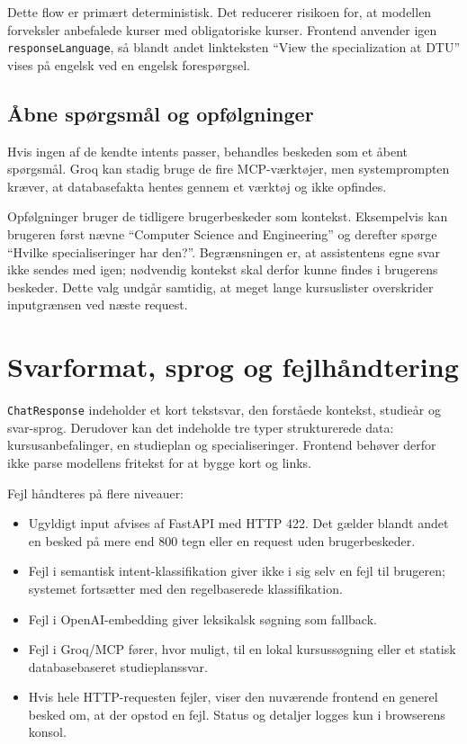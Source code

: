 \documentclass[11pt,a4paper]{article}
\newcommand{\code}[1]{\texttt{#1}}
\begin{document}
Dette flow er primært deterministisk. Det reducerer risikoen for, at modellen
forveksler anbefalede kurser med obligatoriske kurser. Frontend anvender igen
\code{responseLanguage}, så blandt andet linkteksten ``View the specialization
at DTU'' vises på engelsk ved en engelsk forespørgsel.

\subsection{Åbne spørgsmål og opfølgninger}

Hvis ingen af de kendte intents passer, behandles beskeden som et åbent
spørgsmål. Groq kan stadig bruge de fire MCP-værktøjer, men systemprompten
kræver, at databasefakta hentes gennem et værktøj og ikke opfindes.

Opfølgninger bruger de tidligere brugerbeskeder som kontekst. Eksempelvis kan
brugeren først nævne ``Computer Science and Engineering'' og derefter spørge
``Hvilke specialiseringer har den?''. Begrænsningen er, at assistentens egne
svar ikke sendes med igen; nødvendig kontekst skal derfor kunne findes i
brugerens beskeder. Dette valg undgår samtidig, at meget lange kursuslister
overskrider inputgrænsen ved næste request.

\section{Svarformat, sprog og fejlhåndtering}

\code{ChatResponse} indeholder et kort tekstsvar, den forståede kontekst,
studieår og svar-sprog. Derudover kan det indeholde tre typer strukturerede
data: kursusanbefalinger, en studieplan og specialiseringer. Frontend behøver
derfor ikke parse modellens fritekst for at bygge kort og links.

Fejl håndteres på flere niveauer:

\begin{itemize}
  \item Ugyldigt input afvises af FastAPI med HTTP 422. Det gælder blandt andet
  en besked på mere end 800 tegn eller en request uden brugerbeskeder.
  \item Fejl i semantisk intent-klassifikation giver ikke i sig selv en fejl til
  brugeren; systemet fortsætter med den regelbaserede klassifikation.
  \item Fejl i OpenAI-embedding giver leksikalsk søgning som fallback.
  \item Fejl i Groq/MCP fører, hvor muligt, til en lokal kursussøgning eller et
  statisk databasebaseret studieplanssvar.
  \item Hvis hele HTTP-requesten fejler, viser den nuværende frontend en
  generel besked om, at der opstod en fejl. Status og detaljer logges kun i
  browserens konsol.
\end{itemize}
\end{document}
